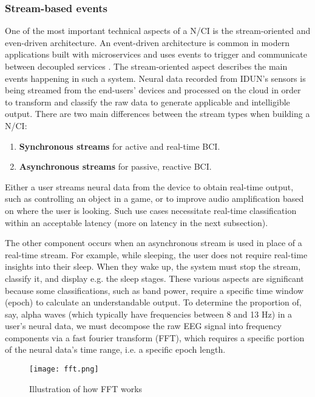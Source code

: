 \subsubsection{Stream-based events}
\label{chapter5-stream-based-events}

One of the most important technical aspects of a N/CI is the stream-oriented and even-driven architecture. An event-driven architecture is common in modern applications built with microservices and uses events to trigger and communicate between decoupled services \citep{amazon_web_services_inc_event-driven_nodate}. The stream-oriented aspect describes the main events happening in such a system. Neural data recorded from IDUN's sensors is being streamed from the end-users' devices and processed on the cloud in order to transform and classify the raw data to generate applicable and intelligible output. There are two main differences between the stream types when building a N/CI:

\begin{enumerate}
\item \textbf{Synchronous streams} for active and real-time BCI.
\item \textbf{Asynchronous streams} for passive, reactive BCI.
\end{enumerate}

Either a user streams neural data from the device to obtain real-time output, such as controlling an object in a game, or to improve audio amplification based on where the user is looking. Such use cases necessitate real-time classification within an acceptable latency (more on latency in the next subsection).

The other component occurs when an asynchronous stream is used in place of a real-time stream. For example, while sleeping, the user does not require real-time insights into their sleep. When they wake up, the system must stop the stream, classify it, and display e.g. the sleep stages. These various aspects are significant because some classifications, such as band power, require a specific time window (epoch) to calculate an understandable output. To determine the proportion of, say, alpha waves (which typically have frequencies between 8 and 13 Hz) in a user's neural data, we must decompose the raw EEG signal into frequency components via a fast fourier transform (FFT), which requires a specific portion of the neural data's time range, i.e. a specific epoch length. 

\begin{figure}[!ht]
  \centering
  \texttt{[image: fft.png]}
  \caption[Illustration of how FFT works]{Illustration of how FFT works \citep{3blue1brown_but_2018}}
  \label{fig:fft}
\end{figure}

